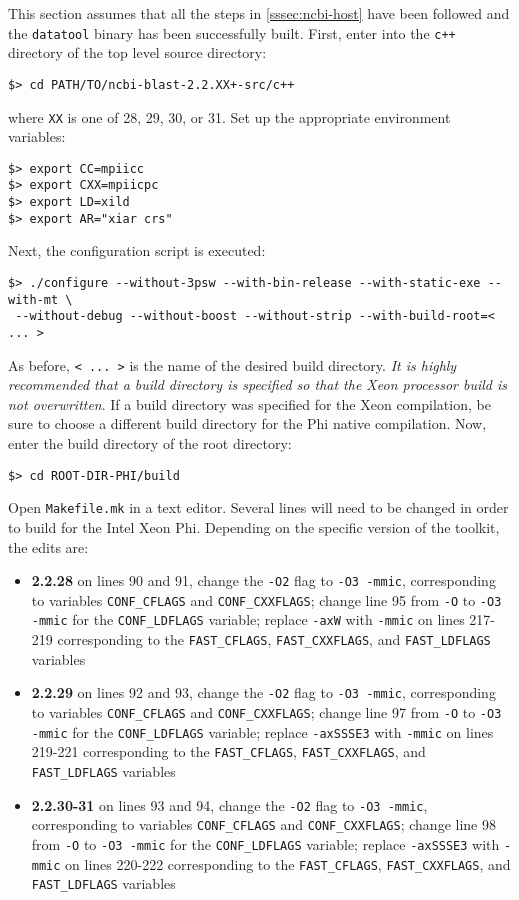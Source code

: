 \documentclass[10pt]{article}
\begin{document}
This section assumes that all the steps in \ref{sssec:ncbi-host} have been followed and the \verb^datatool^ binary has been successfully built.  First, enter into the \verb^c++^ directory of the top level source directory:
\begin{verbatim}
$> cd PATH/TO/ncbi-blast-2.2.XX+-src/c++
\end{verbatim}
\noindent where \verb^XX^ is one of 28, 29, 30, or 31. Set up the appropriate environment variables:
\begin{verbatim}
$> export CC=mpiicc
$> export CXX=mpiicpc
$> export LD=xild
$> export AR="xiar crs" 
\end{verbatim}
\noindent Next, the configuration script is executed:
\begin{verbatim}
$> ./configure --without-3psw --with-bin-release --with-static-exe --with-mt \
 --without-debug --without-boost --without-strip --with-build-root=< ... >
\end{verbatim}
\noindent As before, \verb^< ... >^ is the name of the desired build directory.  \emph{It is highly recommended that a build directory is specified so that the Xeon processor build is not overwritten}. If a build directory was specified for the Xeon compilation,
be sure to choose a different build directory for the Phi native compilation.  Now, enter the build directory of the root directory:
\begin{verbatim}
$> cd ROOT-DIR-PHI/build
\end{verbatim}
\noindent Open \verb^Makefile.mk^ in a text editor.  Several lines will need to be changed in order to build for the Intel Xeon Phi.  Depending on the specific version of the toolkit, the edits are:
\begin{itemize}
\item {\bf 2.2.28} on lines 90 and 91, change the \verb^-O2^ flag to \verb^-O3 -mmic^, corresponding to variables \verb^CONF_CFLAGS^ and \verb^CONF_CXXFLAGS^; change line 95 from \verb^-O^ to \verb^-O3 -mmic^ for the \verb^CONF_LDFLAGS^ variable; replace \verb^-axW^ with \verb^-mmic^ on lines 217-219 corresponding to the \verb^FAST_CFLAGS^, \verb^FAST_CXXFLAGS^, and \verb^FAST_LDFLAGS^ variables
\item {\bf 2.2.29} on lines 92 and 93, change the \verb^-O2^ flag to \verb^-O3 -mmic^, corresponding to variables \verb^CONF_CFLAGS^ and \verb^CONF_CXXFLAGS^; change line 97 from \verb^-O^ to \verb^-O3 -mmic^ for the \verb^CONF_LDFLAGS^ variable; replace \verb^-axSSSE3^ with \verb^-mmic^ on lines 219-221 corresponding to the \verb^FAST_CFLAGS^, \verb^FAST_CXXFLAGS^, and \verb^FAST_LDFLAGS^ variables
\item {\bf 2.2.30-31} on lines 93 and 94, change the \verb^-O2^ flag to \verb^-O3 -mmic^, corresponding to variables \verb^CONF_CFLAGS^ and \verb^CONF_CXXFLAGS^; change line 98 from \verb^-O^ to \verb^-O3 -mmic^ for the \verb^CONF_LDFLAGS^ variable; replace \verb^-axSSSE3^ with \verb^-mmic^ on lines 220-222 corresponding to the \verb^FAST_CFLAGS^, \verb^FAST_CXXFLAGS^, and \verb^FAST_LDFLAGS^ variables
\end{itemize}
\end{document}

